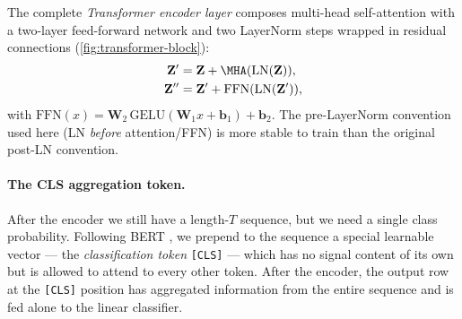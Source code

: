 The complete \emph{Transformer encoder layer} composes multi-head
self-attention with a two-layer feed-forward network and two LayerNorm
\cite{ba2016layer} steps wrapped in residual connections
(\cref{fig:transformer-block}):
\begin{align}
    \mathbf{Z}' &= \mathbf{Z} + \MHA(\mathrm{LN}(\mathbf{Z})), \\
    \mathbf{Z}'' &= \mathbf{Z}' + \mathrm{FFN}(\mathrm{LN}(\mathbf{Z}')),
\end{align}
with $\mathrm{FFN}(x) = \mathbf{W}_2 \, \mathrm{GELU}(\mathbf{W}_1 x + \mathbf{b}_1) + \mathbf{b}_2$.
The pre-LayerNorm convention used here (LN \emph{before} attention/FFN)
is more stable to train than the original post-LN convention.

\paragraph{The CLS aggregation token.}
After the encoder we still have a length-$T$ sequence, but we need a
single class probability. Following BERT \cite{devlin2019bert}, we
prepend to the sequence a special learnable vector --- the
\emph{classification token} \texttt{[CLS]} --- which has no signal
content of its own but is allowed to attend to every other token. After
the encoder, the output row at the \texttt{[CLS]} position has
aggregated information from the entire sequence and is fed alone to the
linear classifier.

